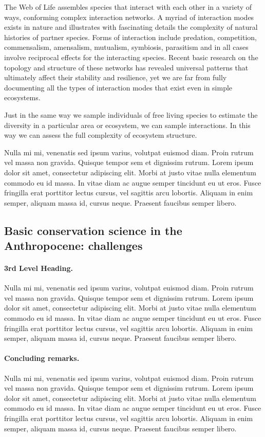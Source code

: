 \documentclass[10pt,letterpaper]{article}
\begin{document}
The Web of Life assembles species that interact with each other in a variety of ways, conforming complex interaction networks. A myriad of interaction modes exists in nature and illustrates with fascinating details the complexity of natural histories of partner species. Forms of interaction include predation, competition, commensalism, amensalism, mutualism, symbiosis, parasitism and in all cases involve reciprocal effects for the interacting species. Recent basic research on the topology and structure of these networks has revealed universal patterns that ultimately affect their stability and resilience, yet we are far from fully documenting all the types of interaction modes that exist even in simple ecosystems. 

Just in the same way we sample individuals of free living species to estimate the diversity in a particular area or ecosystem, we can sample interactions. In this way we can assess the full complexity of ecosystem structure.

Nulla mi mi, venenatis sed ipsum varius, volutpat euismod diam. Proin rutrum vel massa non gravida. Quisque tempor sem et dignissim rutrum. Lorem ipsum dolor sit amet, consectetur adipiscing elit. Morbi at justo vitae nulla elementum commodo eu id massa. In vitae diam ac augue semper tincidunt eu ut eros. Fusce fringilla erat porttitor lectus cursus, vel sagittis arcu lobortis. Aliquam in enim semper, aliquam massa id, cursus neque. Praesent faucibus semper libero.

\subsection*{Basic conservation science in the Anthropocene: challenges}
\paragraph{3rd Level Heading.} Nulla mi mi, venenatis sed ipsum varius, volutpat euismod diam. Proin rutrum vel massa non gravida. Quisque tempor sem et dignissim rutrum. Lorem ipsum dolor sit amet, consectetur adipiscing elit. Morbi at justo vitae nulla elementum commodo eu id massa. In vitae diam ac augue semper tincidunt eu ut eros. Fusce fringilla erat porttitor lectus cursus, vel sagittis arcu lobortis. Aliquam in enim semper, aliquam massa id, cursus neque. Praesent faucibus semper libero.

\paragraph{Concluding remarks.} Nulla mi mi, venenatis sed ipsum varius, volutpat euismod diam. Proin rutrum vel massa non gravida. Quisque tempor sem et dignissim rutrum. Lorem ipsum dolor sit amet, consectetur adipiscing elit. Morbi at justo vitae nulla elementum commodo eu id massa. In vitae diam ac augue semper tincidunt eu ut eros. Fusce fringilla erat porttitor lectus cursus, vel sagittis arcu lobortis. Aliquam in enim semper, aliquam massa id, cursus neque. Praesent faucibus semper libero.
\end{document}
